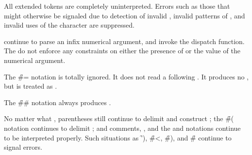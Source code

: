       
\beginlist




All extended tokens are completely uninterpreted.
Errors such as those that might otherwise be signaled due to
     detection of invalid ,
     invalid patterns of ,
 and invalid uses of the  character are suppressed.


 continue to parse an infix numerical
argument, and invoke the dispatch function.  The 
  do not enforce any constraints
on either the presence of or the value of the numerical argument.


\itemitem{\tt \#=}

The \f{\#=} notation is totally ignored.  It does not read
a following . It produces no ,
but is treated as .

\itemitem{\tt \#\#}

The \f{\#\#} notation always produces \nil.
\endlist

No matter what ,
parentheses still continue to delimit and construct ;
the \f{\#(} notation continues to delimit ;
and comments, , 
and the  and  notations continue to be
interpreted properly.  Such situations as
\f{')},	\f{\#<}, %
\f{\#)}, and \f{\#\SpaceChar} continue to signal errors.


